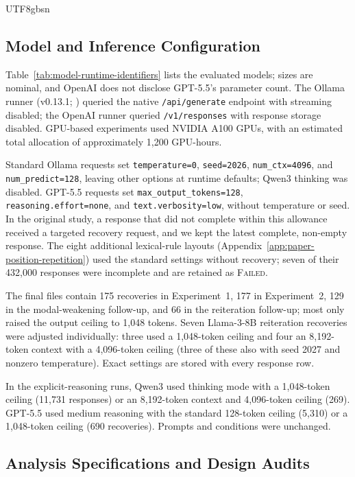 \documentclass[11pt]{article}
\begin{document}
\begin{CJK*}{UTF8}{gbsn}
\subsection{Model and Inference Configuration}
\label{app:inference-details}

Table~\ref{tab:model-runtime-identifiers} lists the evaluated models; sizes are nominal, and OpenAI does not disclose GPT-5.5's parameter count. The Ollama runner (v0.13.1; \citealp{ollama2025}) queried the native \texttt{/api/generate} endpoint with streaming disabled; the OpenAI runner queried \texttt{/v1/responses} with response storage disabled. GPU-based experiments used NVIDIA A100 GPUs, with an estimated total allocation of approximately 1,200 GPU-hours.

Standard Ollama requests set \texttt{temperature=0}, \texttt{seed=2026}, \texttt{num\_ctx=4096}, and \texttt{num\_predict=128}, leaving other options at runtime defaults; Qwen3 thinking was disabled. GPT-5.5 requests set \texttt{max\_output\_tokens=128}, \texttt{reasoning.effort=none}, and \texttt{text.verbosity=low}, without temperature or seed. In the original study, a response that did not complete within this allowance received a targeted recovery request, and we kept the latest complete, non-empty response. The eight additional lexical-rule layouts (Appendix~\ref{app:paper-position-repetition}) used the standard settings without recovery; seven of their 432,000 responses were incomplete and are retained as \textsc{Failed}.

The final files contain 175 recoveries in Experiment~1, 177 in Experiment~2, 129 in the modal-weakening follow-up, and 66 in the reiteration follow-up; most only raised the output ceiling to 1,048 tokens. Seven Llama-3-8B reiteration recoveries were adjusted individually: three used a 1,048-token ceiling and four an 8,192-token context with a 4,096-token ceiling (three of these also with seed 2027 and nonzero temperature). Exact settings are stored with every response row.

In the explicit-reasoning runs, Qwen3 used thinking mode with a 1,048-token ceiling (11,731 responses) or an 8,192-token context and 4,096-token ceiling (269). GPT-5.5 used medium reasoning with the standard 128-token ceiling (5,310) or a 1,048-token ceiling (690 recoveries). Prompts and conditions were unchanged.

\subsection{Analysis Specifications and Design Audits}
\label{app:analysis-audits}


\end{CJK*}
\end{document}
